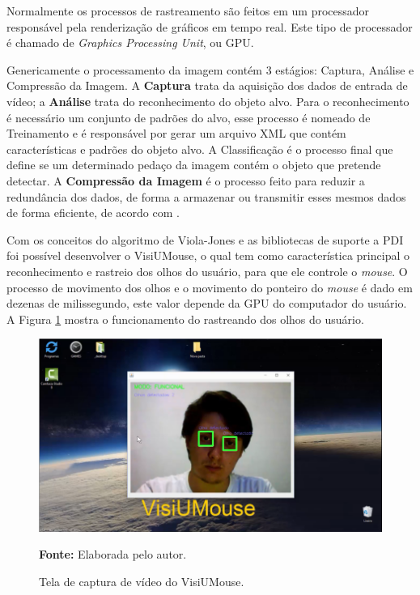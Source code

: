 Normalmente os processos de rastreamento são feitos em um processador responsável pela renderização de gráficos em tempo real. Este tipo de processador é chamado de \textit{Graphics Processing Unit}, ou GPU.

Genericamente o processamento da imagem contém 3 estágios: Captura, Análise e Compressão da Imagem. A \textbf{Captura} trata da aquisição dos dados de entrada de vídeo; a \textbf{Análise} trata do reconhecimento do objeto alvo. Para o reconhecimento é necessário um conjunto de padrões do alvo, esse processo é nomeado de Treinamento e é responsável por gerar um arquivo XML que contém características e padrões do objeto alvo. A Classificação é o processo final que define se um determinado pedaço da imagem contém o objeto que pretende detectar. A \textbf{Compressão da Imagem} é o processo feito para reduzir a redundância dos dados, de forma a armazenar ou transmitir esses mesmos dados de forma eficiente, de acordo com .

Com os conceitos do algoritmo de Viola-Jones e as bibliotecas de suporte a PDI foi possível desenvolver o VisiUMouse, o qual tem como característica principal o reconhecimento e rastreio dos olhos do usuário, para  que ele controle o \textit{mouse}. O processo de movimento dos olhos e o movimento do ponteiro do \textit{mouse} é dado em dezenas de milissegundo, este valor depende da GPU do computador do usuário. A Figura \ref{fig:visiumouse-1} mostra o funcionamento do rastreando dos olhos do usuário.
\begin{figure}[H]
\centering
\caption{Tela de captura de vídeo do VisiUMouse.}
\includegraphics[scale=.4]{img/visiumouse-1.png}

 {\fontsize{11}{11}\selectfont \textbf{Fonte:} Elaborada pelo autor.}
\label{fig:visiumouse-1}
\end{figure}

